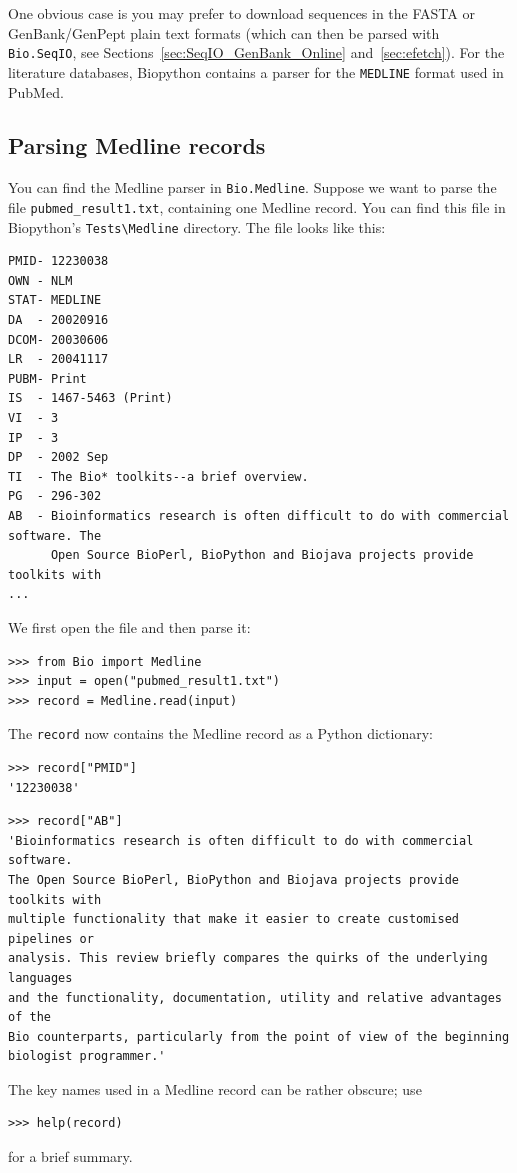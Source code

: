 \documentclass{report}
\begin{document}
One obvious case is you may prefer to download sequences in the FASTA or GenBank/GenPept plain text formats (which can then be parsed with \verb|Bio.SeqIO|, see Sections~\ref{sec:SeqIO_GenBank_Online} and~\ref{sec:efetch}).  For the literature databases, Biopython contains a parser for the \verb+MEDLINE+ format used in PubMed.

\subsection{Parsing Medline records}
\label{subsec:entrez-and-medline}
You can find the Medline parser in \verb+Bio.Medline+. Suppose we want to parse the file \verb+pubmed_result1.txt+, containing one Medline record. You can find this file in Biopython's \verb+Tests\Medline+ directory. The file looks like this:

\begin{verbatim}
PMID- 12230038
OWN - NLM
STAT- MEDLINE
DA  - 20020916
DCOM- 20030606
LR  - 20041117
PUBM- Print
IS  - 1467-5463 (Print)
VI  - 3
IP  - 3
DP  - 2002 Sep
TI  - The Bio* toolkits--a brief overview.
PG  - 296-302
AB  - Bioinformatics research is often difficult to do with commercial software. The
      Open Source BioPerl, BioPython and Biojava projects provide toolkits with
...
\end{verbatim}
We first open the file and then parse it:
\begin{verbatim}
>>> from Bio import Medline
>>> input = open("pubmed_result1.txt")
>>> record = Medline.read(input)
\end{verbatim}
The \verb+record+ now contains the Medline record as a Python dictionary:
\begin{verbatim}
>>> record["PMID"]
'12230038'
\end{verbatim}
\begin{verbatim}
>>> record["AB"]
'Bioinformatics research is often difficult to do with commercial software.
The Open Source BioPerl, BioPython and Biojava projects provide toolkits with
multiple functionality that make it easier to create customised pipelines or
analysis. This review briefly compares the quirks of the underlying languages
and the functionality, documentation, utility and relative advantages of the
Bio counterparts, particularly from the point of view of the beginning
biologist programmer.'
\end{verbatim}
The key names used in a Medline record can be rather obscure; use
\begin{verbatim}
>>> help(record)
\end{verbatim}
for a brief summary.
\end{document}
